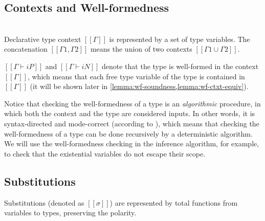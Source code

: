 \documentclass[acmsmall,natbib=false,review,anonymous]{acmart}
\begin{document}
\subsection{Contexts and Well-formedness}

\begin{definition}
  \hfill \\
  Declarative type context $[[Γ]]$ is represented by a set of 
  type variables. The concatenation $[[Γ1, Γ2]]$ means the 
  union of two contexts $[[Γ1 ∪ Γ2]]$.
\end{definition}

$[[Γ ⊢ iP]]$ and $[[Γ ⊢ iN]]$ denote that the type is well-formed in the context $[[Γ]]$,
which means that each free type variable of the type is contained in $[[Γ]]$
(it will be shown later in \cref{lemma:wf-soundness,lemma:wf-ctxt-equiv}).

Notice that checking the well-formedness of a type
is an \emph{algorithmic} procedure, in which 
both the context and the type are considered inputs.
In other words, it is syntax-directed and mode-correct 
(according to \cite{dunfieldBidirectionalTyping2020}), 
which means that checking the well-formedness of a type
can be done recursively by a deterministic algorithm. 
We will use the well-formedness checking in the inference algorithm, 
for example, to check that the existential variables do not escape their scope.

\begin{algorithm}
  \label{alg:wf}
  \hfill
  
  \begin{multicols}{2}
  \ottdefnWFTNiWFLabeled{}
  \columnbreak

  \ottdefnWFTPiWFLabeled{}
  \end{multicols}

\end{algorithm}


\subsection{Substitutions}

\begin{definition}[Substitution]
  Substitutions (denoted as $[[σ]]$) 
  are represented by total functions from variables to types, preserving the polarity. 
\end{definition}
\end{document}
